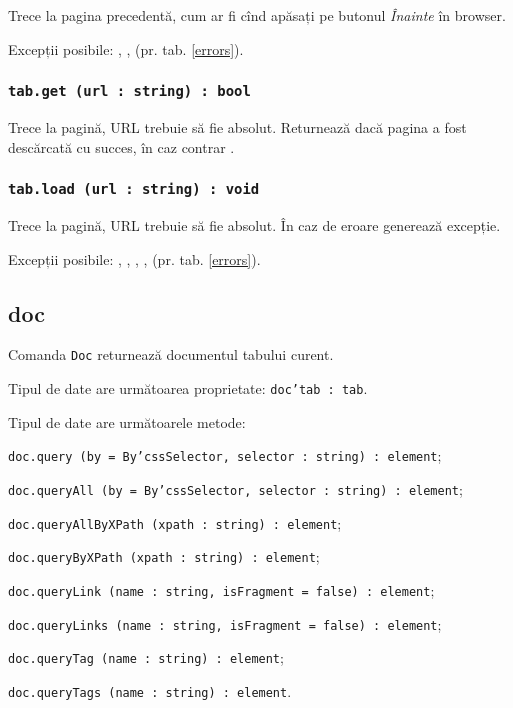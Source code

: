 Trece la pagina precedentă, cum ar fi cînd apăsați pe butonul \textit{Înainte} în browser.


Excepții posibile: , ,  (pr. tab. \ref{errors}).

\subsubsection{\texttt{tab.get (url : string) : bool}}

Trece la pagină, URL trebuie să fie absolut. Returnează \true{} dacă pagina a fost descărcată cu succes, în caz contrar \false.

\subsubsection{\texttt{tab.load (url : string) : void}}

Trece la pagină, URL trebuie să fie absolut. În caz de eroare generează excepție.

Excepții posibile: , , , ,  (pr. tab. \ref{errors}).

\subsection{{\color{orange} doc}}

Comanda \texttt{Doc} returnează documentul tabului curent.

Tipul de date \dom{} are următoarea proprietate: \texttt{doc'tab : tab}.

Tipul de date \dom{} are următoarele metode:
\begin{icItems}
	\item \texttt{doc.query (by = By'cssSelector, selector : string) : element};
	\item \texttt{doc.queryAll (by = By'cssSelector, selector : string) : element};
	\item \texttt{doc.queryAllByXPath (xpath : string) : element};
	\item \texttt{doc.queryByXPath (xpath : string) : element};
	\item \texttt{doc.queryLink (name : string, isFragment = false) : element};
	\item \texttt{doc.queryLinks (name : string, isFragment = false) : element};
	\item \texttt{doc.queryTag (name : string) : element};
	\item \texttt{doc.queryTags (name : string) : element}.
\end{icItems}

